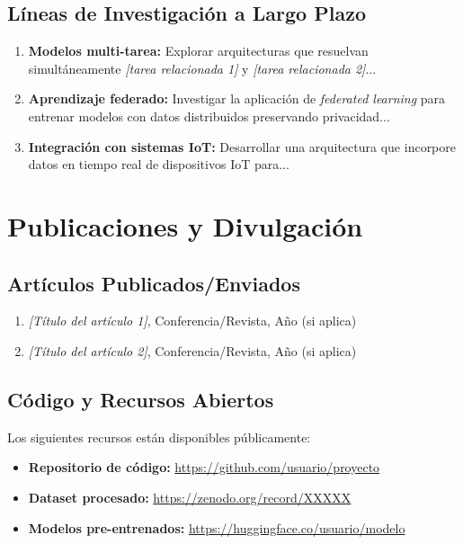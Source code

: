\subsection{Líneas de Investigación a Largo Plazo}

\begin{enumerate}
    \item \textbf{Modelos multi-tarea:} Explorar arquitecturas que resuelvan simultáneamente \textit{[tarea relacionada 1]} y \textit{[tarea relacionada 2]}...
    
    \item \textbf{Aprendizaje federado:} Investigar la aplicación de \textit{federated learning} para entrenar modelos con datos distribuidos preservando privacidad...
    
    \item \textbf{Integración con sistemas IoT:} Desarrollar una arquitectura que incorpore datos en tiempo real de dispositivos IoT para...
\end{enumerate}

\section{Publicaciones y Divulgación}
\label{sec:publicaciones}

\subsection{Artículos Publicados/Enviados}

\begin{enumerate}
    \item \textit{[Título del artículo 1]}, Conferencia/Revista, Año (si aplica)
    \item \textit{[Título del artículo 2]}, Conferencia/Revista, Año (si aplica)
\end{enumerate}

\subsection{Código y Recursos Abiertos}

Los siguientes recursos están disponibles públicamente:

\begin{itemize}
    \item \textbf{Repositorio de código:} \url{https://github.com/usuario/proyecto}
    \item \textbf{Dataset procesado:} \url{https://zenodo.org/record/XXXXX}
    \item \textbf{Modelos pre-entrenados:} \url{https://huggingface.co/usuario/modelo}
\end{itemize}

